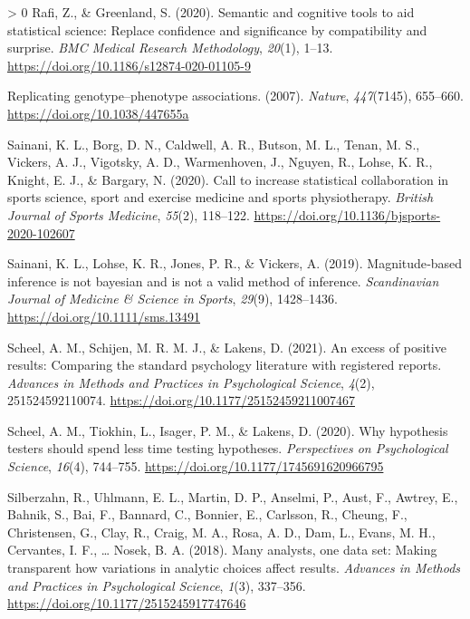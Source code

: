 \documentclass[]{cik}%
\newlength{\cslhangindent}
\newenvironment{CSLReferences}[3] %
 {%
  \setlength{\parindent}{0pt}
  \ifodd #1 \everypar{\setlength{\hangindent}{\cslhangindent}}\ignorespaces\fi
  \ifnum #2 > 0
  \setlength{\parskip}{#2\baselineskip}
  \fi
 }%
 {}
\begin{document}
\begin{CSLReferences}{1}{0}
\leavevmode\hypertarget{ref-rafi2020semantic}{}%
Rafi, Z., \& Greenland, S. (2020). Semantic and cognitive tools to aid
statistical science: Replace confidence and significance by
compatibility and surprise. \emph{BMC Medical Research Methodology},
\emph{20}(1), 1--13. \url{https://doi.org/10.1186/s12874-020-01105-9}

\leavevmode\hypertarget{ref-chanock_2007}{}%
Replicating genotype--phenotype associations. (2007). \emph{Nature},
\emph{447}(7145), 655--660. \url{https://doi.org/10.1038/447655a}

\leavevmode\hypertarget{ref-sainani2020}{}%
Sainani, K. L., Borg, D. N., Caldwell, A. R., Butson, M. L., Tenan, M.
S., Vickers, A. J., Vigotsky, A. D., Warmenhoven, J., Nguyen, R., Lohse,
K. R., Knight, E. J., \& Bargary, N. (2020). Call to increase
statistical collaboration in sports science, sport and exercise medicine
and sports physiotherapy. \emph{British Journal of Sports Medicine},
\emph{55}(2), 118--122.
\url{https://doi.org/10.1136/bjsports-2020-102607}

\leavevmode\hypertarget{ref-Sainani_Lohse_Jones_Vickers_2019}{}%
Sainani, K. L., Lohse, K. R., Jones, P. R., \& Vickers, A. (2019).
Magnitude‐based inference is not bayesian and is not a valid method of
inference. \emph{Scandinavian Journal of Medicine \& Science in Sports},
\emph{29}(9), 1428--1436. \url{https://doi.org/10.1111/sms.13491}

\leavevmode\hypertarget{ref-scheel_excess_2020}{}%
Scheel, A. M., Schijen, M. R. M. J., \& Lakens, D. (2021). An excess of
positive results: Comparing the standard psychology literature with
registered reports. \emph{Advances in Methods and Practices in
Psychological Science}, \emph{4}(2), 251524592110074.
\url{https://doi.org/10.1177/25152459211007467}

\leavevmode\hypertarget{ref-Scheel2020}{}%
Scheel, A. M., Tiokhin, L., Isager, P. M., \& Lakens, D. (2020). Why
hypothesis testers should spend less time testing hypotheses.
\emph{Perspectives on Psychological Science}, \emph{16}(4), 744--755.
\url{https://doi.org/10.1177/1745691620966795}

\leavevmode\hypertarget{ref-ManyAnalysts2018}{}%
Silberzahn, R., Uhlmann, E. L., Martin, D. P., Anselmi, P., Aust, F.,
Awtrey, E., Bahnik, S., Bai, F., Bannard, C., Bonnier, E., Carlsson, R.,
Cheung, F., Christensen, G., Clay, R., Craig, M. A., Rosa, A. D., Dam,
L., Evans, M. H., Cervantes, I. F., \ldots{} Nosek, B. A. (2018). Many
analysts, one data set: Making transparent how variations in analytic
choices affect results. \emph{Advances in Methods and Practices in
Psychological Science}, \emph{1}(3), 337--356.
\url{https://doi.org/10.1177/2515245917747646}


\end{CSLReferences}
\end{document}
